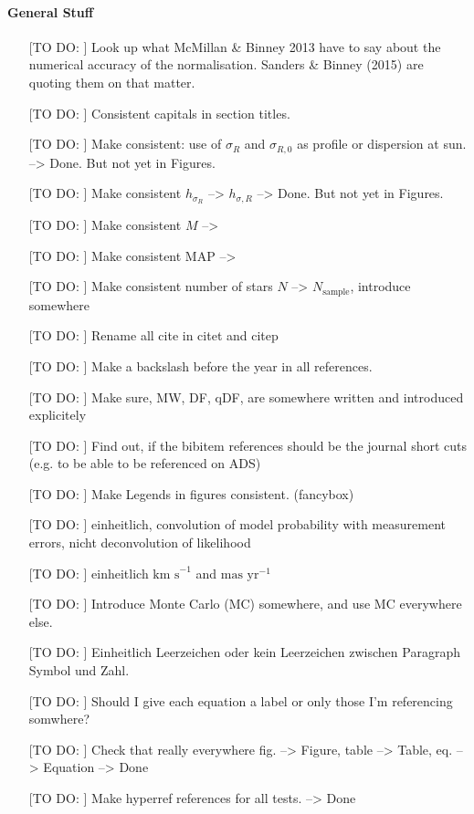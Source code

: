 \paragraph{General Stuff}
\begin{itemize}
\item[[TO DO:]] Look up what McMillan \& Binney 2013 have to say about the numerical accuracy of the normalisation. Sanders \& Binney (2015) are quoting them on that matter.
\item[[TO DO:]] Consistent capitals in section titles.
\item[[TO DO:]] Make consistent: use of $\sigma_R$ and $\sigma_{R,0}$ as profile or dispersion at sun. --> Done. But not yet in Figures.
\item[[TO DO:]] Make consistent $h_{\sigma_R}$ --> $h_{\sigma,R}$ --> Done. But not yet in Figures.
\item[[TO DO:]] Make consistent $M$ --> \pmodel
\item[[TO DO:]] Make consistent MAP --> \MAP
\item[[TO DO:]] Make consistent number of stars $N$ --> $N_\text{sample}$, introduce somewhere
\item[[TO DO:]] Rename all cite in citet and citep
\item[[TO DO:]] Make a backslash before the year in all references.
\item[[TO DO:]] Make sure, MW, DF, qDF, \pdf{} are somewhere written and introduced explicitely
\item[[TO DO:]] Find out, if the bibitem references should be the journal short cuts (e.g. to be able to be referenced on ADS)
\item[[TO DO:]] Make Legends in figures consistent. (fancybox)
\item[[TO DO:]] einheitlich, convolution of model probability with measurement errors, nicht deconvolution of likelihood
\item[[TO DO:]] einheitlich $\text{km s}^{-1}$ and $\text{mas yr}^{-1}$
\item[[TO DO:]] Introduce Monte Carlo (MC) somewhere, and use MC everywhere else.
\item[[TO DO:]] Einheitlich Leerzeichen oder kein Leerzeichen zwischen Paragraph Symbol und Zahl.
\item[[TO DO:]] Should I give each equation a label or only those I'm referencing somwhere?
\item[[TO DO:]] Check that really everywhere fig. --> Figure, table --> Table, eq. --> Equation --> Done
\item[[TO DO:]] Make hyperref references for all tests. --> Done

\end{itemize}
